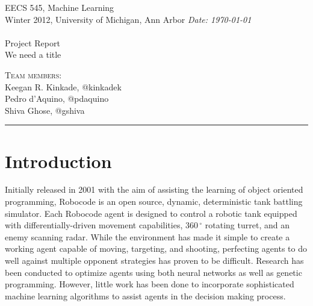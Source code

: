 \documentclass{article}
\newcommand{\shortbar}{\begin{center}\rule{5ex}{0.1pt}\end{center}}
\newcommand{\courseNumber}{EECS 545}
\newcommand{\courseTitle}{Machine Learning}
\newcommand{\semester}{Winter 2012}
\theoremstyle{plain}
\theoremstyle{definition}
\theoremstyle{remark}
\newenvironment{solution}[1]{\medskip\noindent{\bf Problem #1.~}}{\shortbar}
\newcommand{\solutions}[4]{
\vspace{-2ex}
\begin{center}
{\small  \courseNumber, \courseTitle
\hfill {\Large \bf {#1} }\\
\semester, University of Michigan, Ann Arbor \hfill
{\em Date: #3}}\\
\vspace{-1ex}
\hrulefill\\
\vspace{4ex}
{\normalsize Project Report}\\
{\LARGE  #2}\\
\vspace{2ex}
\end{center}
\begin{trivlist}
\item \textsc{Team members:} {#4}
\end{trivlist}
\noindent
\vspace{-1cm}
\shortbar
\vspace{-0.5cm}
}
\begin{document}
\solutions{}{We need a title}{\today}{\\ Keegan R. Kinkade, @kinkadek\\ Pedro d'Aquino, @pdaquino \\Shiva Ghose, @gshiva }
%
%

\begin{abstract}

Robocode\cite{robocode} is a battle-tank simulator, for which players write robotic agents to compete amongst each other. Traditionally, agents actions have been hard-coded. In this project, we create a robot that uses machine learning techniques to decide which actions to take during a battle. Specifically, support vector machines are implemented to learn evasion and targeting strategies with competitive results. Q-learning is also implemented to learn targeting strategies, but with less success. Our agents is tested against a subset of competitive available Robocode robots.
\end{abstract}

\section{Introduction}

Initially released in 2001 with the aim of assisting the learning of object oriented programming, Robocode is an open source, dynamic, deterministic tank battling simulator. Each Robocode agent is designed to control a robotic tank equipped with differentially-driven movement capabilities, $360\,^{\circ}\mathrm{}$ rotating turret, and an enemy scanning radar. While the environment has made it simple to create a working agent capable of moving, targeting, and shooting, perfecting agents to do well against multiple opponent strategies has proven to be difficult. Research has been conducted to optimize agents using both neural networks as well as genetic programming. However, little work has been done to incorporate sophisticated machine learning algorithms to assist agents in the decision making process. 
\end{document}
